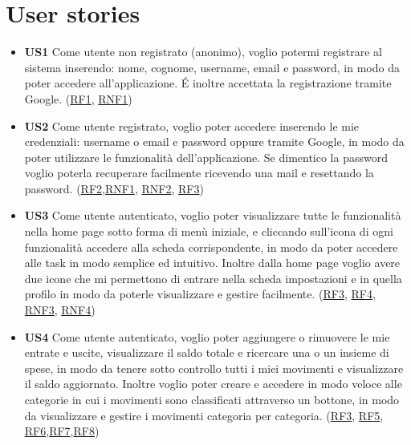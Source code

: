 \documentclass[a4paper,12pt]{article}
\begin{document}
\section*{User stories}
\begin{itemize} \setlength\itemsep{0.01em}
\item \textbf {US1} Come utente non registrato (anonimo), voglio potermi registrare al sistema inserendo: nome, cognome, username, email e password, in modo da poter accedere all'applicazione. É inoltre accettata la registrazione tramite Google. (\hyperlink{RF1}{RF1}, \hyperlink{RNF1}{RNF1})

\begin{center}
\end{center}

\item\textbf {US2} Come utente registrato, voglio poter accedere inserendo le mie credenziali: username o email e password oppure tramite Google, in modo da poter utilizzare le funzionalità dell'applicazione. Se dimentico la password voglio poterla recuperare facilmente ricevendo una mail e resettando la password. (\hyperlink{RF2}{RF2},\hyperlink{RNF1}{RNF1}, \hyperlink{RNF2}{RNF2}, \hyperlink{RNF3}{RF3})

\begin{center}
\end{center}


\item \textbf {US3} Come utente autenticato, voglio poter visualizzare tutte le funzionalità nella home page sotto forma di menù iniziale, e cliccando sull'icona di ogni funzionalità accedere alla scheda corrispondente, in modo da poter accedere alle task in modo semplice ed intuitivo. Inoltre dalla home page voglio avere due icone che mi permettono di entrare nella scheda impostazioni e in quella profilo in modo da poterle visualizzare e gestire facilmente. (\hyperlink{RF3}{RF3}, \hyperlink{RF4}{RF4}, \hyperlink{RNF3}{RNF3}, \hyperlink{RNF4}{RNF4})

\begin{center}
\end{center}

\item \textbf {US4} Come utente autenticato, voglio poter aggiungere o rimuovere le mie entrate e uscite, visualizzare il saldo totale e ricercare una o un insieme di spese, in modo da tenere sotto controllo tutti i miei movimenti e visualizzare il saldo aggiornato. Inoltre voglio poter creare e accedere in modo veloce alle categorie in cui i movimenti sono classificati attraverso un bottone, in modo da visualizzare e gestire i movimenti categoria per categoria. (\hyperlink{RF3}{RF3}, \hyperlink{RF5}{RF5}, \hyperlink{RF6}{RF6},\hyperlink{RF7}{RF7},\hyperlink{RF8}{RF8})


\end{itemize}
\end{document}
